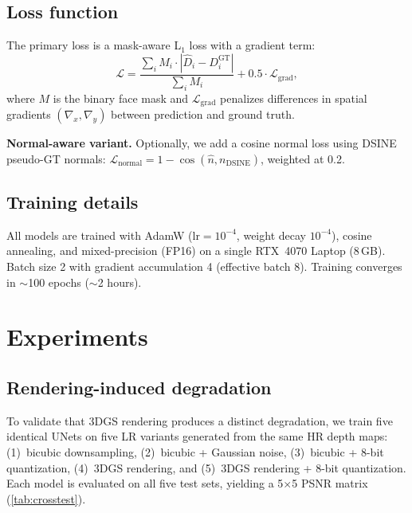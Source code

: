 \documentclass[10pt,twocolumn,letterpaper]{article}
\begin{document}
\subsection{Loss function}

The primary loss is a mask-aware L$_1$ loss with a gradient term:
\begin{equation}
    \mathcal{L} = \frac{\sum_{i} M_i \cdot |\hat{D}_i - D_i^{\text{GT}}|}{\sum_i M_i} + 0.5 \cdot \mathcal{L}_{\text{grad}},
\end{equation}
where $M$ is the binary face mask and $\mathcal{L}_{\text{grad}}$ penalizes differences in spatial gradients $(\nabla_x, \nabla_y)$ between prediction and ground truth.

\textbf{Normal-aware variant.}
Optionally, we add a cosine normal loss using DSINE~\cite{bae2024dsine} pseudo-GT normals:
$\mathcal{L}_{\text{normal}} = 1 - \cos(\hat{n}, n_{\text{DSINE}})$,
weighted at 0.2.

\subsection{Training details}

All models are trained with AdamW ($\text{lr}=10^{-4}$, weight decay $10^{-4}$), cosine annealing, and mixed-precision (FP16) on a single RTX~4070 Laptop (8\,GB).
Batch size 2 with gradient accumulation 4 (effective batch 8).
Training converges in $\sim$100 epochs ($\sim$2 hours).

\section{Experiments}
\label{sec:experiments}

\subsection{Rendering-induced degradation}
\label{sec:degradation}

To validate that 3DGS rendering produces a distinct degradation, we train five identical UNets on five LR variants generated from the same HR depth maps: (1)~bicubic downsampling, (2)~bicubic + Gaussian noise, (3)~bicubic + 8-bit quantization, (4)~3DGS rendering, and (5)~3DGS rendering + 8-bit quantization.
Each model is evaluated on all five test sets, yielding a 5$\times$5 PSNR matrix (\cref{tab:crosstest}).
\end{document}
